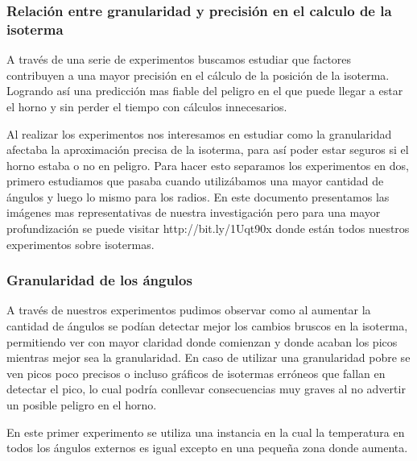 \subsubsection{Relación entre granularidad y precisión en el calculo de la isoterma}
A través de una serie de experimentos buscamos estudiar que factores contribuyen a una mayor precisión en el cálculo de la posición de la isoterma. Logrando así una predicción mas fiable del peligro en el que puede llegar a estar el horno y sin perder el tiempo con cálculos innecesarios.


Al realizar los experimentos nos interesamos en estudiar como la granularidad afectaba la aproximación precisa de la isoterma, para así poder estar seguros si el horno estaba o no en peligro. Para hacer esto separamos los experimentos en dos, primero estudiamos que pasaba cuando utilizábamos una mayor cantidad de ángulos y luego lo mismo para los radios. En este documento presentamos las imágenes mas representativas de nuestra investigación pero para una mayor profundización se puede visitar http://bit.ly/1Uqt90x donde están todos nuestros experimentos sobre isotermas.

\subsubsection{Granularidad de los ángulos}

A través de nuestros experimentos pudimos observar como al aumentar la cantidad de ángulos se podían detectar mejor los cambios bruscos en la isoterma, permitiendo ver con mayor claridad donde comienzan y donde acaban los picos mientras mejor sea la granularidad. En caso de utilizar una granularidad pobre se ven picos poco precisos o incluso gráficos de isotermas erróneos que fallan en detectar el pico, lo cual podría conllevar consecuencias muy graves al no advertir un posible peligro en el horno.


En este primer experimento se utiliza una instancia en la cual la temperatura en todos los ángulos externos es igual excepto en una pequeña zona donde aumenta.

